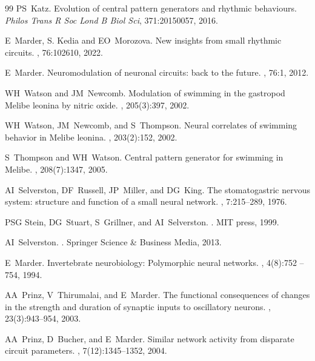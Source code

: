 \documentclass[nofootinbib,aip,amsmath,amssymb,reprint,twocolumn,10pt]{revtex4-2}
\begin{document}
\begin{thebibliography}{99}
PS~Katz.
\newblock Evolution of central pattern generators and rhythmic behaviours.
 {\em Philos Trans R Soc Lond B Biol Sci}, 371:20150057, 2016. 
  

 E~Marder, S. Kedia and EO~Morozova.
\newblock New insights from small rhythmic circuits.
,
  76:102610, 2022.

E~Marder.
\newblock Neuromodulation of neuronal circuits: back to the future.
, 76:1, 2012.

WH~Watson and JM~Newcomb.
\newblock Modulation of swimming in the gastropod Melibe leonina by nitric
  oxide.
, 205(3):397, 2002.

WH~Watson, JM~Newcomb, and S~Thompson.
\newblock Neural correlates of swimming behavior in Melibe leonina.
, 203(2):152, 2002.

S~Thompson and WH~Watson.
\newblock Central pattern generator for swimming in Melibe.
, 208(7):1347, 2005.


AI~Selverston, DF~Russell, JP~Miller, and DG~King.
\newblock The stomatogastric nervous system: structure and function of a small
  neural network.
, 7:215--289, 1976.

PSG Stein, DG~Stuart, S~Grillner, and AI~Selverston.
.
\newblock MIT press, 1999.

AI~Selverston.
.
\newblock Springer Science \& Business Media, 2013.

E~Marder.
\newblock Invertebrate neurobiology: Polymorphic neural networks.
, 4(8):752 -- 754, 1994.

AA~Prinz, V~Thirumalai, and E~Marder.
\newblock The functional consequences of changes in the strength and duration
  of synaptic inputs to oscillatory neurons.
, 23(3):943--954, 2003.

AA~Prinz, D~Bucher, and E~Marder.
\newblock Similar network activity from disparate circuit parameters.
, 7(12):1345--1352, 2004.


\end{thebibliography}
\end{document}

